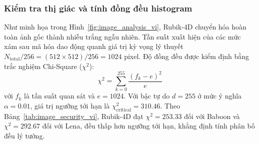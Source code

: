 \documentclass[10pt,twocolumn]{article}
\begin{document}
\subsubsection{Kiểm tra thị giác và tính đồng đều histogram}
Như minh họa trong Hình~\ref{fig:image_analysis_vi}, Rubik-4D chuyển hóa hoàn toàn ảnh gốc thành nhiễu trắng ngẫu nhiên. Tần suất xuất hiện của các mức xám sau mã hóa dao động quanh giá trị kỳ vọng lý thuyết $N_{\text{total}}/256 = (512 \times 512)/256 = 1024$ pixel. Độ đồng đều được kiểm định bằng trắc nghiệm Chi-Square ($\chi^2$):
\begin{equation}
    \chi^2 = \sum_{k=0}^{255} \frac{(f_k - e)^2}{e}
\end{equation}
với $f_k$ là tần suất quan sát và $e = 1024$. Với bậc tự do $d = 255$ ở mức ý nghĩa $\alpha = 0.01$, giá trị ngưỡng tới hạn là $\chi_{\text{critical}}^2 = 310.46$. Theo Bảng~\ref{tab:image_security_vi}, Rubik-4D đạt $\chi^2 = 253.33$ đối với Baboon và $\chi^2 = 292.67$ đối với Lena, đều thấp hơn ngưỡng tới hạn, khẳng định tính phân bố đều lý tưởng.
\end{document}
